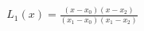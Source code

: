 \documentclass[preview]{standalone}
\begin{document}
\begin{align*}
L_1(x) = \frac{(x - x_0)(x - x_2)}{(x_1 - x_0)(x_1 - x_2)}
\end{align*}
\end{document}
